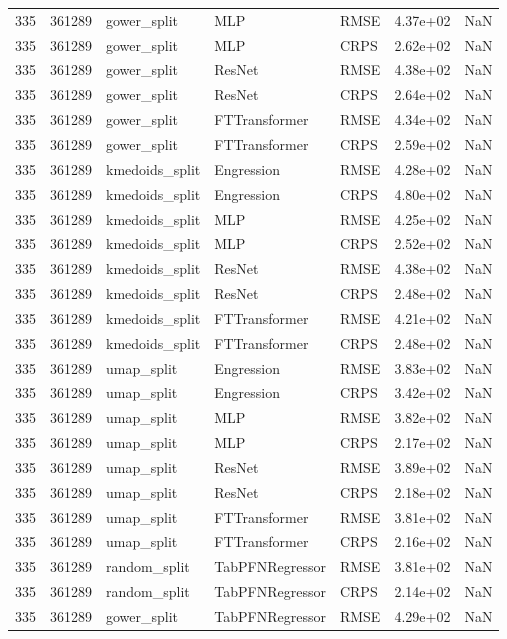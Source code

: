 \begin{tabular}{rrlllrr}
335 & 361289 & gower\_split & MLP & RMSE & 4.37e+02 & NaN \\
335 & 361289 & gower\_split & MLP & CRPS & 2.62e+02 & NaN \\
335 & 361289 & gower\_split & ResNet & RMSE & 4.38e+02 & NaN \\
335 & 361289 & gower\_split & ResNet & CRPS & 2.64e+02 & NaN \\
335 & 361289 & gower\_split & FTTransformer & RMSE & 4.34e+02 & NaN \\
335 & 361289 & gower\_split & FTTransformer & CRPS & 2.59e+02 & NaN \\
335 & 361289 & kmedoids\_split & Engression & RMSE & 4.28e+02 & NaN \\
335 & 361289 & kmedoids\_split & Engression & CRPS & 4.80e+02 & NaN \\
335 & 361289 & kmedoids\_split & MLP & RMSE & 4.25e+02 & NaN \\
335 & 361289 & kmedoids\_split & MLP & CRPS & 2.52e+02 & NaN \\
335 & 361289 & kmedoids\_split & ResNet & RMSE & 4.38e+02 & NaN \\
335 & 361289 & kmedoids\_split & ResNet & CRPS & 2.48e+02 & NaN \\
335 & 361289 & kmedoids\_split & FTTransformer & RMSE & 4.21e+02 & NaN \\
335 & 361289 & kmedoids\_split & FTTransformer & CRPS & 2.48e+02 & NaN \\
335 & 361289 & umap\_split & Engression & RMSE & 3.83e+02 & NaN \\
335 & 361289 & umap\_split & Engression & CRPS & 3.42e+02 & NaN \\
335 & 361289 & umap\_split & MLP & RMSE & 3.82e+02 & NaN \\
335 & 361289 & umap\_split & MLP & CRPS & 2.17e+02 & NaN \\
335 & 361289 & umap\_split & ResNet & RMSE & 3.89e+02 & NaN \\
335 & 361289 & umap\_split & ResNet & CRPS & 2.18e+02 & NaN \\
335 & 361289 & umap\_split & FTTransformer & RMSE & 3.81e+02 & NaN \\
335 & 361289 & umap\_split & FTTransformer & CRPS & 2.16e+02 & NaN \\
335 & 361289 & random\_split & TabPFNRegressor & RMSE & 3.81e+02 & NaN \\
335 & 361289 & random\_split & TabPFNRegressor & CRPS & 2.14e+02 & NaN \\
335 & 361289 & gower\_split & TabPFNRegressor & RMSE & 4.29e+02 & NaN \\

\end{tabular}
